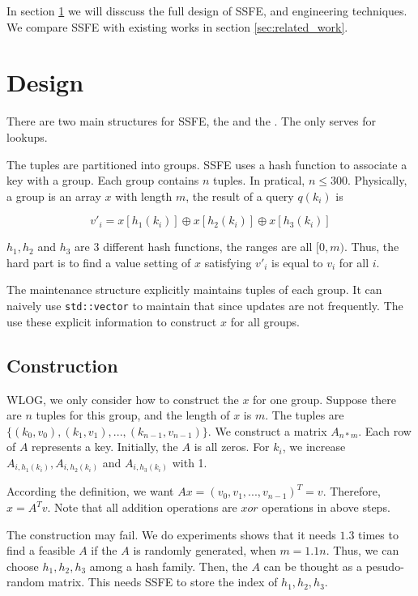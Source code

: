 \documentclass{article}
\begin{document}

In section \ref{sec:design} we will disscuss the full design of SSFE, and engineering techniques. We compare SSFE with existing works in section \ref{sec:related_work}.

\section{Design}
\label{sec:design}

There are two main structures for SSFE, the \qs and the \ms. The \qs only serves for lookups.

\textbf{\qs} The tuples are partitioned into groups. SSFE uses a hash function to associate a key with a group. Each group contains $n$ tuples. In pratical, $n \le 300$. Physically, a group is an array $x$ with length $m$, the result of a query $q(k_i)$ is

$$v'_i = x[h_1(k_i)] \oplus x[h_2(k_i)] \oplus x[h_3(k_i)]$$

$h_1, h_2$ and $h_3$ are 3 different hash functions, the ranges are all $[0, m)$. Thus, the hard part is to find a value setting of $x$ satisfying $v'_i$ is equal to $v_i$ for all $i$.


\textbf{\ms} The maintenance structure explicitly maintains tuples of each group. It can naively use \texttt{std::vector} to maintain that since updates are not frequently. The \ms use these explicit information to construct $x$ for all groups.


\subsection{Construction}
\label{sec:construction}

WLOG, we only consider how to construct the $x$ for one group. Suppose there are $n$ tuples for this group, and the length of $x$ is $m$. The tuples are $\{(k_0, v_0), (k_1, v_1), ..., (k_{n-1}, v_{n-1})\}$. We construct a matrix $A_{n*m}$. Each row of $A$ represents a key. Initially, the $A$ is all zeros. For $k_i$, we increase $A_{i,h_1(k_i)}, A_{i,h_2(k_i)}$ and $A_{i,h_3(k_i)}$ with 1.

According the definition, we want $Ax = (v_0, v_1, ..., v_{n-1})^T = v$. Therefore, $x = A^{T}v$. Note that all addition operations are $xor$ operations in above steps.

The construction may fail. We do experiments shows that it needs $1.3$ times to find a feasible $A$ if the $A$ is randomly generated, when $m = 1.1n$. Thus, we can choose $h_1, h_2, h_3$ among a hash family. Then, the $A$ can be thought as a pesudo-random matrix. This needs SSFE to store the index of $h_1, h_2, h_3$.
\end{document}
